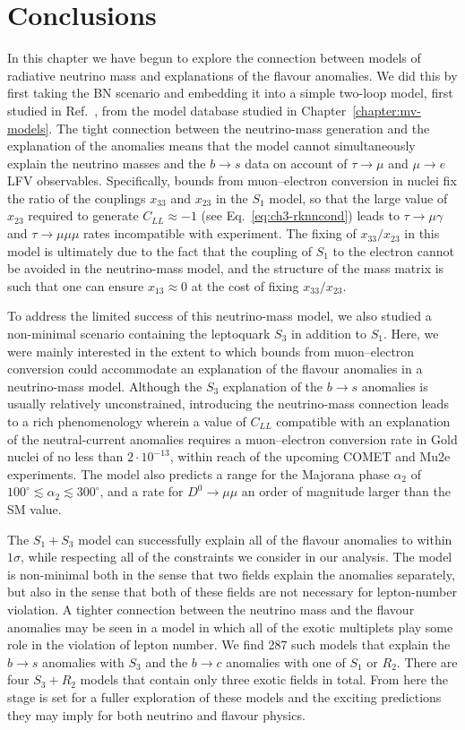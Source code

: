 \section{Conclusions}

In this chapter we have begun to explore the connection between models of
radiative neutrino mass and explanations of the flavour anomalies. We did this
by first taking the BN scenario and embedding it into a simple two-loop model,
first studied in Ref.~\cite{Angel:2013hla}, from the model database studied in
Chapter~\ref{chapter:mv-models}. The tight connection between the neutrino-mass
generation and the explanation of the anomalies means that the model cannot
simultaneously explain the neutrino masses and the $b \to s$ data on account of
$\tau \to \mu$ and $\mu \to e$ LFV observables. Specifically, bounds from
muon--electron conversion in nuclei fix the ratio of the couplings $x_{33}$ and
$x_{23}$ in the $S_{1}$ model, so that the large value of $x_{23}$ required to
generate $C_{LL} \approx -1$ (see Eq.~\eqref{eq:ch3-rknncond}) leads to
$\tau \to \mu \gamma$ and $\tau \to \mu\mu\mu$ rates incompatible with
experiment. The fixing of $x_{33} / x_{23}$ in this model is ultimately due to
the fact that the coupling of $S_{1}$ to the electron cannot be avoided in the
neutrino-mass model, and the structure of the mass matrix is such that one can
ensure $x_{13} \approx 0$ at the cost of fixing $x_{33} / x_{23}$.

To address the limited success of this neutrino-mass model, we also studied a
non-minimal scenario containing the leptoquark $S_{3}$ in addition to $S_{1}$.
Here, we were mainly interested in the extent to which bounds from
muon--electron conversion could accommodate an explanation of the flavour
anomalies in a neutrino-mass model. Although the $S_{3}$ explanation of the
$b \to s$ anomalies is usually relatively unconstrained, introducing the
neutrino-mass connection leads to a rich phenomenology wherein a value of
$C_{LL}$ compatible with an explanation of the neutral-current anomalies
requires a muon--electron conversion rate in Gold nuclei of no less than
$2 \cdot 10^{-13}$, within reach of the upcoming COMET and Mu2e experiments. The
model also predicts a range for the Majorana phase $\alpha_{2}$ of
$100^{\circ} \lesssim \alpha_{2} \lesssim 300^{\circ}$, and a rate for
$D^{0} \to \mu\mu$ an order of magnitude larger than the SM value.

The $S_{1} + S_{3}$ model can successfully explain all of the flavour anomalies
to within $1\sigma$, while respecting all of the constraints we consider in our
analysis. The model is non-minimal both in the sense that two fields explain the
anomalies separately, but also in the sense that both of these fields are not
necessary for lepton-number violation. A tighter connection between the neutrino
mass and the flavour anomalies may be seen in a model in which all of the exotic
multiplets play some role in the violation of lepton number. We find 287 such
models that explain the $b \to s$ anomalies with $S_{3}$ and the $b \to c$
anomalies with one of $S_{1}$ or $R_{2}$. There are four $S_{3} + R_{2}$ models
that contain only three exotic fields in total. From here the stage is set for a
fuller exploration of these models and the exciting predictions they may imply
for both neutrino and flavour physics.
